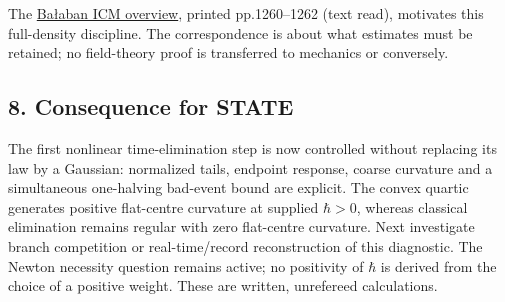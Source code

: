 \documentclass[11pt,a4paper]{article}
\begin{document}
The
\href{../docs/balaban/Balaban_UltravioletStability_ICM1986_1987.md}{Bałaban
ICM overview}, printed pp.1260--1262 (text read), motivates this
full-density discipline. The correspondence is about what estimates must
be retained; no field-theory proof is transferred to mechanics or
conversely.

\hypertarget{consequence-for-state}{%
\subsection{8. Consequence for STATE}\label{consequence-for-state}}

The first nonlinear time-elimination step is now controlled without
replacing its law by a Gaussian: normalized tails, endpoint response,
coarse curvature and a simultaneous one-halving bad-event bound are
explicit. The convex quartic generates positive flat-centre curvature at
supplied \(\hbar>0\), whereas classical elimination remains regular with
zero flat-centre curvature. Next investigate branch competition or
real-time/record reconstruction of this diagnostic. The Newton necessity
question remains active; no positivity of \(\hbar\) is derived from the
choice of a positive weight. These are written, unrefereed calculations.
\end{document}
